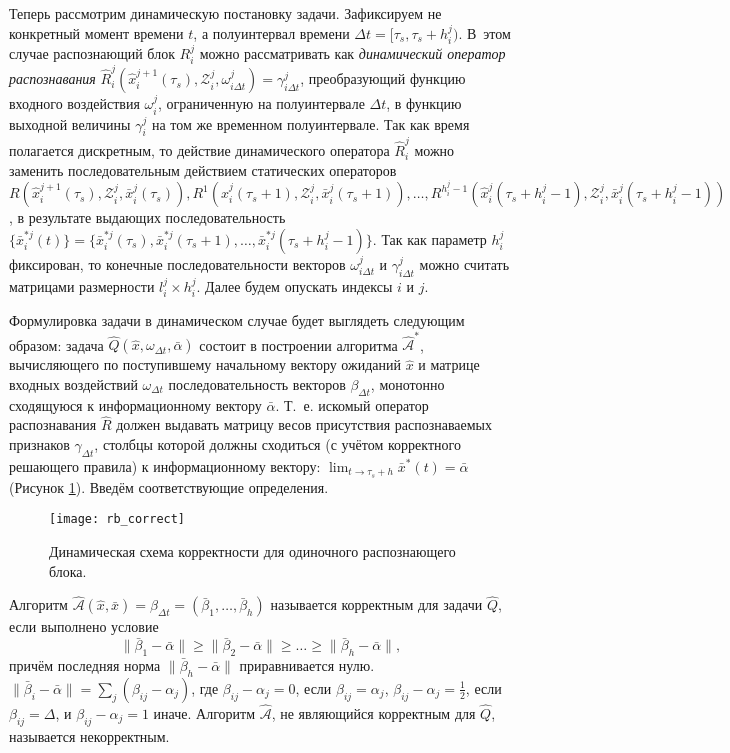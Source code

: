 Теперь рассмотрим динамическую постановку задачи. Зафиксируем не конкретный момент времени $t$, а полуинтервал времени ${\Delta}t=[\tau_s,\tau_s+h_i^j)$. В~этом случае распознающий блок $R_i^j$ можно рассматривать как \textit{динамический оператор распознавания} $\hat{R}_i^j(\hat{x}_i^{j+1}(\tau_s), \mathcal{Z}_i^j, \omega_{i\Delta{t}}^j)=\gamma_{i\Delta{t}}^j$, преобразующий  функцию входного воздействия $\omega_i^j$, ограниченную на полуинтервале ${\Delta}t$, в функцию выходной величины $\gamma_i^j$ на том же временном полуинтервале. Так как время полагается дискретным, то действие динамического оператора $\hat{R}_i^j$ можно заменить последовательным действием статических операторов $R(\hat{x}_i^{j+1}(\tau_s), \mathcal{Z}_i^j, \bar{x}_i^j(\tau_s)), R^1(\hat{x}_i^j(\tau_s+1), \mathcal{Z}_i^j, \bar{x}_i^j(\tau_s+1)), \dots, R^{h_i^j-1}(\hat{x}_i^j(\tau_s+h_i^j-1), \mathcal{Z}_i^j, \bar{x}_i^j(\tau_s+h_i^j-1))$, в результате выдающих последовательность $\{\bar{x}_i^{*j}(t)\}=\{\bar{x}_i^{*j}(\tau_s), \bar{x}_i^{*j}(\tau_s+1), \dots, \bar{x}_i^{*j}(\tau_s+h_i^j-1)\}$. Так как параметр $h_i^j$ фиксирован, то конечные последовательности векторов  $\omega_{i\Delta{t}}^j$ и $\gamma_{i\Delta{t}}^j$ можно считать матрицами размерности $l_i^j\times{h_i^j}$. Далее будем опускать индексы $i$ и $j$.
	
Формулировка задачи в динамическом случае будет выглядеть следующим образом: задача $\hat{Q}(\hat{x}, \omega_{{\Delta}t}, \bar{\alpha})$ состоит в построении алгоритма $\hat{\mathcal A}^*$, вычисляющего по поступившему начальному вектору ожиданий $\hat{x}$ и матрице входных воздействий $\omega_{{\Delta}t}$  последовательность векторов $\beta_{\Delta{t}}$, монотонно сходящуюся к информационному вектору $\bar{\alpha}$. Т.~е. искомый оператор распознавания $\hat{R}$ должен выдавать матрицу весов присутствия распознаваемых признаков $\gamma_{\Delta{t}}$, столбцы которой должны сходиться (с учётом корректного решающего правила) к информационному вектору: $\lim_{t\to\tau_s+h}\bar{x}^*(t)=\bar{\alpha}$ (Рисунок \ref{fig:rb_correct_dyn}). Введём соответствующие определения.
	
\begin{figure}[h]
	\centering
	\texttt{[image: rb\_correct]}
	\caption{Динамическая схема корректности для одиночного распознающего блока.}
	\label{fig:rb_correct_dyn}
\end{figure}
	
\begin{Def}
	Алгоритм $\hat{\mathcal{A}}(\hat{x},\bar{x})=\beta_{\Delta{t}}=(\bar{\beta}_1,\dots,\bar{\beta}_h)$ называется корректным для задачи $\hat{Q}$, если выполнено условие
	\[
	\|\bar{\beta}_1-\bar{\alpha}\|\geqslant\|\bar{\beta}_2-\bar{\alpha}\|\geqslant\dots
	\geqslant\|\bar{\beta}_h-\bar{\alpha}\|,
	\]
	причём последняя норма $\|\bar{\beta}_h-\bar{\alpha}\|$ приравнивается нулю.
	$\|\bar{\beta}_i-\bar{\alpha}\|=
	\sum_j{(\beta_{ij}-\alpha_j)}$, где $\beta_{ij}-\alpha_j=0$, если $\beta_{ij}=\alpha_j$, $\beta_{ij}-\alpha_j=\frac{1}{2}$, если $\beta_{ij}=\Delta$, и $\beta_{ij}-\alpha_j=1$ иначе. Алгоритм $\hat{\mathcal{A}}$, не являющийся корректным для $\hat{Q}$, называется некорректным.
\end{Def}

